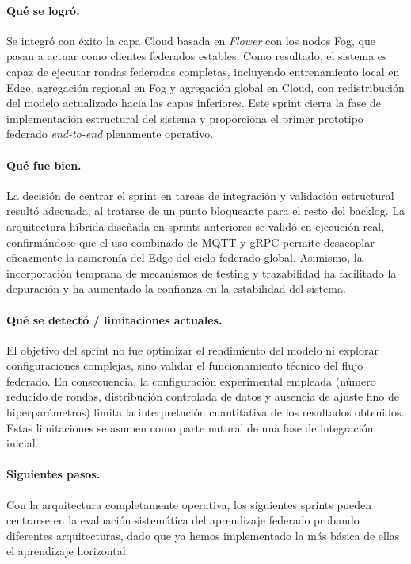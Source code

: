 \documentclass{report}
\begin{document}
\vspace{0.15em}
\paragraph{Qué se logró.}
Se integró con éxito la capa Cloud basada en \textit{Flower} con los nodos Fog, que pasan a actuar como clientes federados estables. Como resultado, el sistema es capaz de ejecutar rondas federadas completas, incluyendo entrenamiento local en Edge, agregación regional en Fog y agregación global en Cloud, con redistribución del modelo actualizado hacia las capas inferiores. Este sprint cierra la fase de implementación estructural del sistema y proporciona el primer prototipo federado \emph{end-to-end} plenamente operativo.

\vspace{0.15em}
\paragraph{Qué fue bien.}
La decisión de centrar el sprint en tareas de integración y validación estructural resultó adecuada, al tratarse de un punto bloqueante para el resto del backlog. La arquitectura híbrida diseñada en sprints anteriores se validó en ejecución real, confirmándose que el uso combinado de MQTT y gRPC permite desacoplar eficazmente la asincronía del Edge del ciclo federado global. Asimismo, la incorporación temprana de mecanismos de testing y trazabilidad ha facilitado la depuración y ha aumentado la confianza en la estabilidad del sistema.

\vspace{0.15em}
\paragraph{Qué se detectó / limitaciones actuales.}
El objetivo del sprint no fue optimizar el rendimiento del modelo ni explorar configuraciones complejas, sino validar el funcionamiento técnico del flujo federado. En consecuencia, la configuración experimental empleada (número reducido de rondas, distribución controlada de datos y ausencia de ajuste fino de hiperparámetros) limita la interpretación cuantitativa de los resultados obtenidos. Estas limitaciones se asumen como parte natural de una fase de integración inicial.

\vspace{0.15em}
\paragraph{Siguientes pasos.}
Con la arquitectura completamente operativa, los siguientes sprints pueden centrarse en la evaluación sistemática del aprendizaje federado probando diferentes arquitecturas, dado que ya hemos implementado la más básica de ellas el aprendizaje horizontal. 
\end{document}
